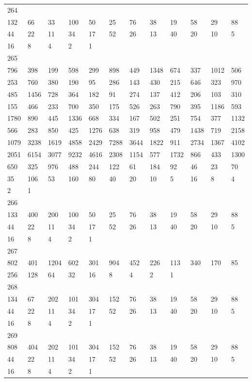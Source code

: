 \begin{longtable}{llllllllllll}
264&&&&&&&&&&&\\
132& 66& 33& 100& 50& 25& 76& 38& 19& 58& 29& 88\\
44& 22& 11& 34& 17& 52& 26& 13& 40& 20& 10& 5\\
16& 8& 4& 2& 1& \\

265&&&&&&&&&&&\\
796& 398& 199& 598& 299& 898& 449& 1348& 674& 337& 1012& 506\\
253& 760& 380& 190& 95& 286& 143& 430& 215& 646& 323& 970\\
485& 1456& 728& 364& 182& 91& 274& 137& 412& 206& 103& 310\\
155& 466& 233& 700& 350& 175& 526& 263& 790& 395& 1186& 593\\
1780& 890& 445& 1336& 668& 334& 167& 502& 251& 754& 377& 1132\\
566& 283& 850& 425& 1276& 638& 319& 958& 479& 1438& 719& 2158\\
1079& 3238& 1619& 4858& 2429& 7288& 3644& 1822& 911& 2734& 1367& 4102\\
2051& 6154& 3077& 9232& 4616& 2308& 1154& 577& 1732& 866& 433& 1300\\
650& 325& 976& 488& 244& 122& 61& 184& 92& 46& 23& 70\\
35& 106& 53& 160& 80& 40& 20& 10& 5& 16& 8& 4\\
2& 1& \\

266&&&&&&&&&&&\\
133& 400& 200& 100& 50& 25& 76& 38& 19& 58& 29& 88\\
44& 22& 11& 34& 17& 52& 26& 13& 40& 20& 10& 5\\
16& 8& 4& 2& 1& \\

267&&&&&&&&&&&\\
802& 401& 1204& 602& 301& 904& 452& 226& 113& 340& 170& 85\\
256& 128& 64& 32& 16& 8& 4& 2& 1& \\

268&&&&&&&&&&&\\
134& 67& 202& 101& 304& 152& 76& 38& 19& 58& 29& 88\\
44& 22& 11& 34& 17& 52& 26& 13& 40& 20& 10& 5\\
16& 8& 4& 2& 1& \\

269&&&&&&&&&&&\\
808& 404& 202& 101& 304& 152& 76& 38& 19& 58& 29& 88\\
44& 22& 11& 34& 17& 52& 26& 13& 40& 20& 10& 5\\
16& 8& 4& 2& 1& \\


\end{longtable}
